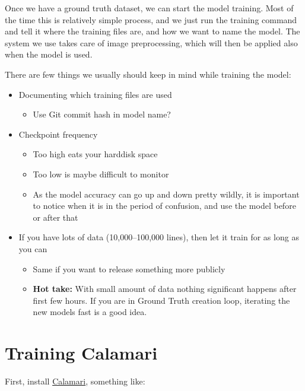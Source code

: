 \documentclass[]{book}
\providecommand{\tightlist}{%
  \setlength{\itemsep}{0pt}\setlength{\parskip}{0pt}}
\begin{document}
Once we have a ground truth dataset, we can start the model training.
Most of the time this is relatively simple process, and we just run the training command and tell it where the training files are, and how we want to name the model. The system we use takes care of image preprocessing, which will then be applied also when the model is used.

There are few things we usually should keep in mind while training the model:

\begin{itemize}
\tightlist
\item
  Documenting which training files are used

  \begin{itemize}
  \tightlist
  \item
    Use Git commit hash in model name?
  \end{itemize}
\item
  Checkpoint frequency

  \begin{itemize}
  \tightlist
  \item
    Too high eats your harddisk space
  \item
    Too low is maybe difficult to monitor
  \item
    As the model accuracy can go up and down pretty wildly, it is important to notice when it is in the period of confusion, and use the model before or after that
  \end{itemize}
\item
  If you have lots of data (10,000--100,000 lines), then let it train for as long as you can

  \begin{itemize}
  \tightlist
  \item
    Same if you want to release something more publicly
  \item
    \textbf{Hot take:} With small amount of data nothing significant happens after first few hours. If you are in Ground Truth creation loop, iterating the new models fast is a good idea.
  \end{itemize}
\end{itemize}

\hypertarget{training-calamari}{%
\section{Training Calamari}\label{training-calamari}}

First, install \href{https://github.com/Calamari-OCR/calamari}{Calamari}, something like:
\end{document}
